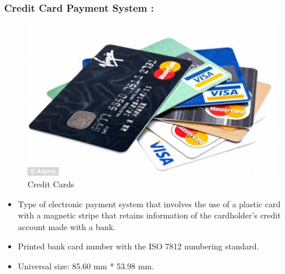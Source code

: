 \documentclass[handout]{beamer}
\begin{document}

\begin{frame}
\frametitle{Credit Card Payment System :}

\begin{figure}[h]
         \begin{center}
\includegraphics[scale=0.3,angle=360]{img1.jpg}
\caption{Credit Cards}
\end{center}
\end{figure}









\begin{itemize}
\item Type of electronic payment system that involves the use of a plastic card with a magnetic stripe that retains information of the cardholder’s credit account made with a bank.
\item  Printed bank card number with the ISO 7812 numbering standard. 
\item Universal size: 85.60 mm * 53.98 mm.

\end{itemize}
\end{frame}
\end{document}
